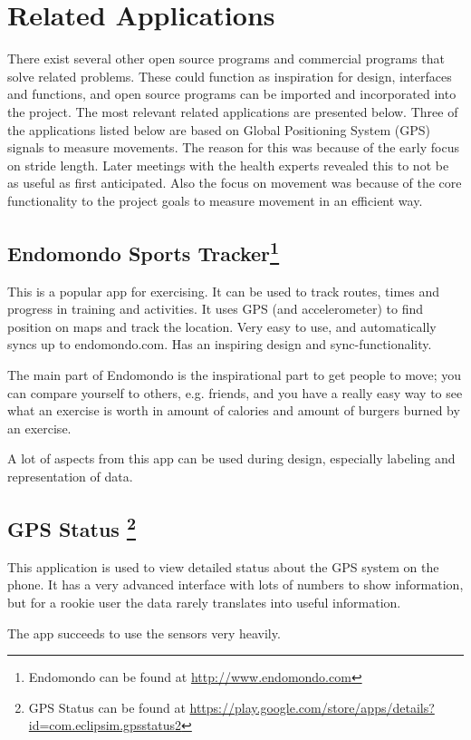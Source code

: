 \section{Related Applications}
There exist several other open source programs and commercial programs that solve related problems. These could function as inspiration for design, interfaces and functions, and open source programs can be imported and incorporated into the project. The most relevant related applications are presented below. Three of the applications listed below are based on Global Positioning System (GPS) signals to measure movements. The reason for this was because of the early focus on stride length. Later meetings with the health experts revealed this to not be as useful as first anticipated. Also the focus on movement was because of the core functionality to the project goals to measure movement in an efficient way.

\subsection{Endomondo Sports Tracker\footnote{Endomondo can be found at \url{http://www.endomondo.com}}}
This is a popular app for exercising. It can be used to track routes, times and progress in training and activities. It uses GPS (and accelerometer) to find position on maps and track the location. Very easy to use, and automatically syncs up to endomondo.com. Has an inspiring design and sync-functionality.

The main part of Endomondo is the inspirational part to get people to move; you can compare yourself to others, e.g. friends, and you have a really easy way to see what an exercise is worth in amount of calories and amount of burgers burned by an exercise.

A lot of aspects from this app can be used during design, especially labeling and representation of data.

\subsection{GPS Status \footnote{GPS Status can be found at \url{https://play.google.com/store/apps/details? id=com.eclipsim.gpsstatus2}}}
This application is used to view detailed status about the GPS system on the phone. It has a very advanced interface with lots of numbers to show information, but for a rookie user the data rarely translates into useful information.

The app succeeds to use the sensors very heavily.

